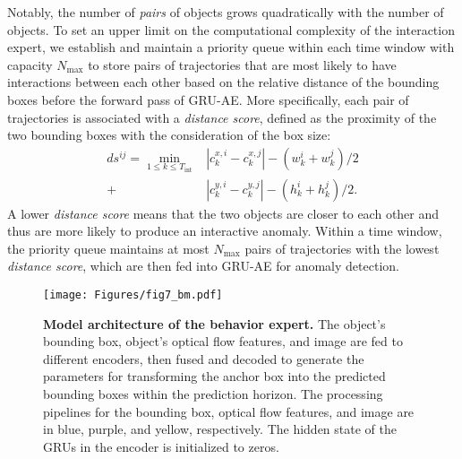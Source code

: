 Notably, the number of \textit{pairs} of objects grows quadratically with the number of objects. To set an upper limit on the computational complexity of the interaction expert, we establish and maintain a priority queue within each time window with capacity $N_\text{max}$ to store pairs of trajectories that are most likely to have interactions between each other based on the relative distance of the bounding boxes before the forward pass of GRU-AE. More specifically, each pair of trajectories is associated with a \textit{distance score}, defined as the proximity of the two bounding boxes with the consideration of the box size:
\begin{equation}
\begin{aligned}
ds^{ij} = \min_{1 \le k \le T_\text{int}} &|c_k^{x,i} - c_k^{x,j}| - (w_k^i + w_k^j)/2 \\
+ &|c_k^{y,i} - c_k^{y,j}| - (h_k^i + h_k^j)/2.
\end{aligned}
\end{equation}
A lower \textit{distance score} means that the two objects are closer to each other and thus are more likely to produce an interactive anomaly. Within a time window, the priority queue maintains at most $N_\text{max}$ pairs of trajectories with the lowest \textit{distance score}, which are then fed into GRU-AE for anomaly detection.

\begin{figure*}[t]
  \centering
  \texttt{[image: Figures/fig7\_bm.pdf]}
  \caption{\textbf{Model architecture of the behavior expert.} The object's bounding box, object's optical flow features, and image are fed to different encoders, then fused and decoded to generate the parameters for transforming the anchor box into the predicted bounding boxes within the prediction horizon. The processing pipelines for the bounding box, optical flow features, and image are in blue, purple, and yellow, respectively. The hidden state of the GRUs in the encoder is initialized to zeros.}
  \label{fig:bm}
\end{figure*}

